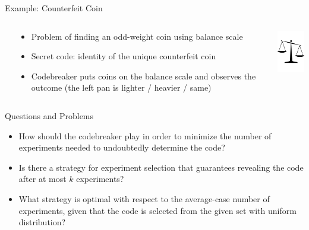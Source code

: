\documentclass[final]{beamer}
\begin{document}
\begin{frame}{}
\begin{columns}[t]
\begin{column}{.48\linewidth}
    \begin{block}{Example: Counterfeit Coin}
    \begin{columns}
      \begin{column}{\parindent}\end{column}
      \begin{column}{.78\textwidth}
        \begin{itemize}
        \item Problem of finding an odd-weight coin using balance scale
        \item Secret code: identity of the unique counterfeit coin 
        \item Codebreaker puts coins on the balance scale and observes the outcome (the left pan is lighter / heavier / same)
        \end{itemize}    
      \end{column}
      \begin{column}{.22\textwidth}
        \includegraphics[width=2cm]{../pictures/scales.pdf}
      \end{column}
    \end{columns}
    \end{block}
      
    \begin{block}{Questions and Problems}
      \begin{itemize}
      \item How should the codebreaker play in order to minimize the number of experiments needed to undoubtedly determine the code?
      \item Is there a strategy for experiment selection that guarantees revealing the code after at most $k$ experiments?
      \item What strategy is optimal with respect to the average-case number of experiments, given that the code is selected from the given set with uniform distribution?
      \end{itemize}
    \end{block}


\end{column}
\end{columns}
\end{frame}
\end{document}
